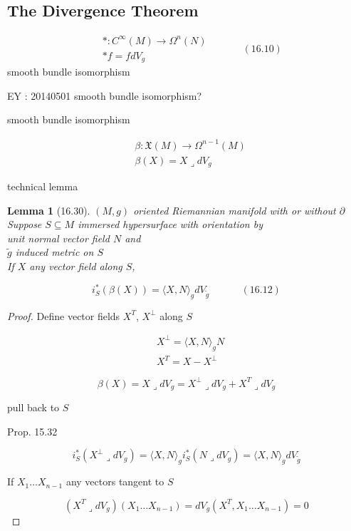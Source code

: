 \documentclass[11pt]{amsart}
\newtheorem{lemma}{Lemma}
\theoremstyle{definition}
\begin{document}
\hrulefill

\subsection*{The Divergence Theorem}


\begin{equation}
  \begin{aligned}
    & * : C^{\infty}{ (M)} \to \Omega^n{ (N) } \\
    & * f = f dV_g
\end{aligned} \quad \quad \quad \, (16.10)
\end{equation}
smooth bundle isomorphism

EY : 20140501 smooth bundle isomorphism?

smooth bundle isomorphism

\[
\begin{aligned}
  & \beta : \mathfrak{X}{(M)} \to \Omega^{n-1}{ (M) } \\
  &  \beta(X) = X \mathbin{\lrcorner} dV_g
\end{aligned}
\]

technical lemma
\begin{lemma}[16.30]
  $(M,g)$ oriented Riemannian manifold with or without $\partial$ \\
  Suppose $S \subseteq M$ immersed hypersurface with orientation by \\
\phantom{Suppose } unit normal vector field $N$ and \\
\phantom{Suppose } $\widetilde{g}$ induced metric on $S$ \\

If $X$ any vector field along $S$,

\begin{equation}
  i^*_S{ (\beta{ (X)} )}  = \langle X, N \rangle_g dV_{\widetilde{g}} \quad \quad \quad \, (16.12)
\end{equation}



\end{lemma}

\begin{proof}
Define vector fields $X^T$, $X^{\perp}$ along $S$

\[
\begin{aligned}
&  X^{\perp} = \langle X, N\rangle_g N \\
&  X^T =  X - X^{\perp}
\end{aligned}
\]

\[
\beta(X) = X \mathbin{\lrcorner} dV_g = X^{\perp} \mathbin{\lrcorner} dV_g + X^T \mathbin{\lrcorner} dV_g
\]

pull back to $S$

Prop. 15.32


\[
i^*_S{ (X^{\perp} \mathbin{\lrcorner} dV_g) }  = \langle X, N \rangle_g i^*_S{ (N \mathbin{\lrcorner} dV_g) } = \langle X, N \rangle_g dV_{ \widetilde{g}}
\]

If $X_1 \dots X_{n-1}$ any vectors tangent to $S$

\[
(X^T \mathbin{\lrcorner} dV_g){ (X_1 \dots X_{n-1} ) } = dV_g{ (X^T, X_1 \dots X_{n-1} ) } = 0
\]



\end{proof}
\end{document}
